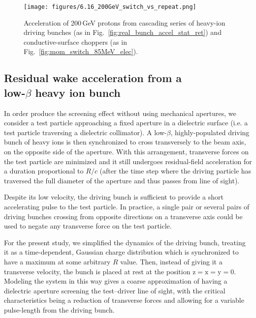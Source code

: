 \documentclass[reprint,
               amsmath,amssymb,nofootinbib, aps%
              ]{revtex4-2}
\begin{document}
\begin{figure}[ht!]
    \centering
    \texttt{[image: figures/6.16\_200GeV\_switch\_vs\_repeat.png]}
    \caption{Acceleration of 200\,GeV protons from cascading series of heavy-ion driving bunches (as in Fig.~\ref{fig:real_bunch_accel_stat_ret}) and conductive-surface choppers (as in Fig.~\ref{fig:mom_switch_85MeV_elec}).}
\label{fig:switching_v_realbunch_repeatingcav_200GeV}
\end{figure}

\subsection{Residual wake acceleration from a\\low-$\beta$ heavy ion bunch}\label{subsec:residual_wake_bunch}

In order produce the screening effect without using mechanical apertures, we consider a test particle approaching a fixed aperture in a dielectric surface (i.e. a test particle traversing a dielectric collimator). A low-$\beta$, highly-populated driving bunch of heavy ions is then synchronized to cross transversely to the beam axis, on the opposite side of the aperture. With this arrangement, transverse forces on the test particle are minimized and it still undergoes residual-field acceleration for a duration proportional to $R/c$ (after the time step where the driving particle has traversed the full diameter of the aperture and thus passes from line of sight).

Despite its low velocity, the driving bunch is sufficient to provide a short accelerating pulse to the test particle. In practice, a single pair or several pairs of driving bunches crossing from opposite directions on a transverse axis could be used to negate any transverse force on the test particle.

For the present study, we simplified the dynamics of the driving bunch, treating it as a time-dependent, Gaussian charge distribution which is synchronized to have a maximum at some arbitrary $R$ value. Then, instead of giving it a transverse velocity, the bunch is placed at rest at the position $\textrm{z}=\textrm{x}=\textrm{y}=0$. Modeling the system in this way gives a coarse approximation of having a dielectric aperture screening the test--driver line of sight, with the critical characteristics being a reduction of transverse forces and allowing for a variable pulse-length from the driving bunch.
\end{document}
